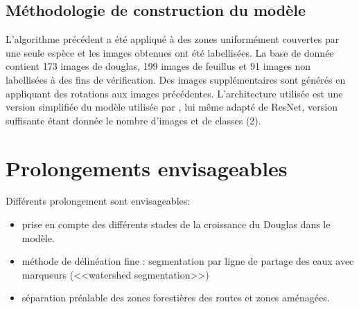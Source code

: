 \documentclass{article}
\begin{document}
	\subsection{Méthodologie de construction du modèle}

		L'algorithme précédent a été appliqué à des zones uniformément couvertes par une seule espèce et les images obtenues ont été labellisées. La base de donnée contient 173 images de douglas, 199 images de feuillus et 91 images non labellisées à des fins de vérification. Des images supplémentaires sont générés en appliquant des rotations aux images précédentes.
		L'architecture utilisée est une version simplifiée du modèle utilisée par , lui même adapté de ResNet, version suffisante étant donnée le nombre d'images et de classes (2).

\section{Prolongements envisageables}

	Différents prolongement sont envisageables: 
	\begin{itemize}
		\item prise en compte des différents stades de la croissance du Douglas dans le modèle.
		\item méthode de délinéation fine : segmentation par ligne de partage des eaux avec marqueurs (<<watershed segmentation>>)
		\item séparation préalable des zones forestières des routes et zones aménagées. 
	\end{itemize}

\nocite{*}
\printbibliography 

\appendix
\end{document}
